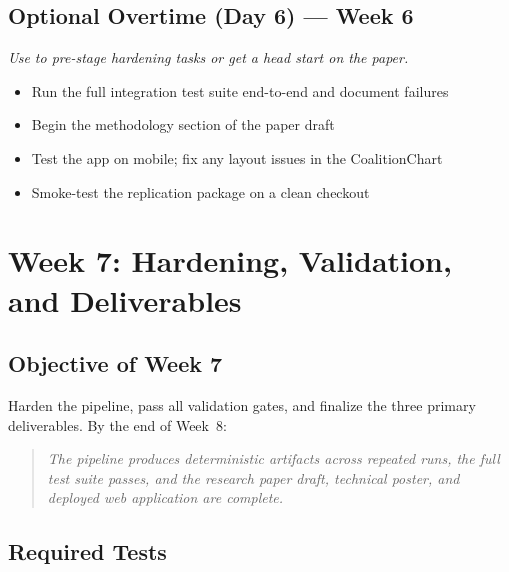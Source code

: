 \documentclass[11pt]{article}
\begin{document}
\subsection*{Optional Overtime (Day 6) --- Week 6}
\textit{Use to pre-stage hardening tasks or get a head start on the paper.}
\begin{itemize}[leftmargin=1.6em, itemsep=2pt]
  \item Run the full integration test suite end-to-end and document failures
  \item Begin the methodology section of the paper draft
  \item Test the app on mobile; fix any layout issues in the CoalitionChart
  \item Smoke-test the replication package on a clean checkout
\end{itemize}

\section{Week 7: Hardening, Validation, and Deliverables}

\subsection*{Objective of Week 7}

Harden the pipeline, pass all validation gates, and finalize the three primary deliverables.
By the end of Week~8:

\begin{quote}
\textit{The pipeline produces deterministic artifacts across repeated runs, the full test
suite passes, and the research paper draft, technical poster, and deployed web application
are complete.}
\end{quote}

\subsection*{Required Tests}
\end{document}
